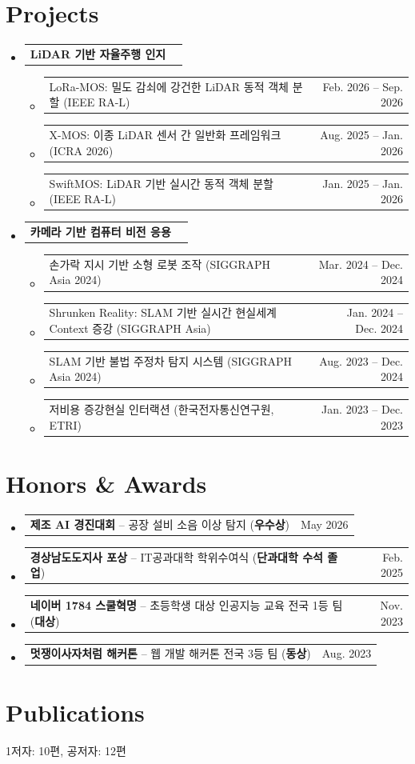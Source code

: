 \documentclass[letterpaper,11pt]{article}
\makeatletter
\newcommand{\resumeSkills}[1]{
  \item\small{
    \begin{tabular*}{0.97\textwidth}[t]{l@{\extracolsep{\fill}}r}
      #1
    \end{tabular*}\vspace{-2pt}
  }
}
\newcommand{\resumeProjectItem}[1]{
  \item\footnotesize{
    \begin{tabular*}{0.93\textwidth}[t]{l@{\extracolsep{\fill}}r}
      #1
    \end{tabular*}\vspace{-2pt}
  }
}
\newcommand{\resumeSubHeadingListStart}{\begin{itemize}[leftmargin=*]}
\newcommand{\resumeSubHeadingListEnd}{\end{itemize}}
\newcommand{\resumeItemListStart}{\begin{itemize}[topsep=-2pt,partopsep=0pt]}
\newcommand{\resumeItemListEnd}{\end{itemize}\vspace{1.6pt}}
\makeatother
\begin{document}
\section{Projects}
\resumeSubHeadingListStart
\resumeSkills{\textbf{LiDAR 기반 자율주행 인지}}
\resumeItemListStart
\resumeProjectItem{LoRa-MOS: 밀도 감쇠에 강건한 LiDAR 동적 객체 분할 (IEEE RA-L) & Feb. 2026 -- Sep. 2026}
\resumeProjectItem{X-MOS: 이종 LiDAR 센서 간 일반화 프레임워크 (ICRA 2026) & Aug. 2025 -- Jan. 2026}
\resumeProjectItem{SwiftMOS: LiDAR 기반 실시간 동적 객체 분할 (IEEE RA-L) & Jan. 2025 -- Jan. 2026}
\resumeItemListEnd
\resumeSkills{\textbf{카메라 기반 컴퓨터 비전 응용}}
\resumeItemListStart
\resumeProjectItem{손가락 지시 기반 소형 로봇 조작 (SIGGRAPH Asia 2024) & Mar. 2024 -- Dec. 2024}
\resumeProjectItem{Shrunken Reality: SLAM 기반 실시간 현실세계 Context 증강 (SIGGRAPH Asia) & Jan. 2024 -- Dec. 2024}
\resumeProjectItem{SLAM 기반 불법 주정차 탐지 시스템 (SIGGRAPH Asia 2024) & Aug. 2023 -- Dec. 2024}
\resumeProjectItem{저비용 증강현실 인터랙션 (한국전자통신연구원, ETRI) & Jan. 2023 -- Dec. 2023}
\resumeItemListEnd
\resumeSubHeadingListEnd

\section{Honors \& Awards}
\resumeSubHeadingListStart
\resumeSkills{\textbf{제조 AI 경진대회} -- 공장 설비 소음 이상 탐지 (\textbf{우수상}) & May 2026}
\resumeSkills{\textbf{경상남도도지사 포상} -- IT공과대학 학위수여식 (\textbf{단과대학 수석 졸업}) & Feb. 2025}
\resumeSkills{\textbf{네이버 1784 스쿨혁명} -- 초등학생 대상 인공지능 교육 전국 1등 팀 (\textbf{대상}) & Nov. 2023}
\resumeSkills{\textbf{멋쟁이사자처럼 해커톤} -- 웹 개발 해커톤 전국 3등 팀 (\textbf{동상}) & Aug. 2023}
\resumeSubHeadingListEnd

\makeatletter{}\makeatother
\section{Publications}
\small 1저자: 10편, 공저자: 12편
\end{document}
